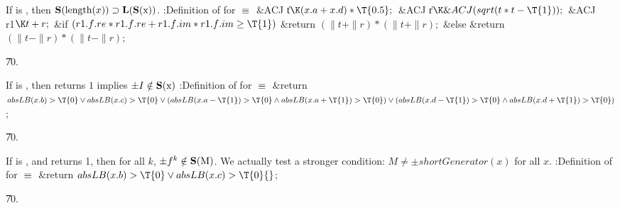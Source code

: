 If  is , then
$\reps{\PB{\\{length}(\|x)}} \supset \tlength{\reps{x}}$.
\endproposition
\Y\B\4:Definition of  for \X${}\equiv{}$%
\6
\&{ACJ} \|t${}\K(\|x.\|a+\|x.\|d)*\T{0.5};{}$\6
\&{ACJ} \|r${}\K\&{ACJ}(\\{sqrt}(\|t*\|t-\T{1}));{}$\6
\&{ACJ} \\{r1}${}\K\|t+\|r;{}$\7
\&{if} ${}(\\{r1}.\|f.\\{re}*\\{r1}.\|f.\\{re}+\\{r1}.\|f.\\{im}*\\{r1}.\|f.%
\\{im}\G\T{1}){}$\1\5
\&{return} ${}(\|t+\|r)*(\|t+\|r);{}$\2\6
\&{else}\1\5
\&{return} ${}(\|t-\|r)*(\|t-\|r){}$;\2\par
\U70.\fi

If  is , then
 returns $1$ implies $\pm I \notin \bf S(\hbox{x})$
\endproposition
\Y\B\4:Definition of  for \X${}%
\E{}$\6
\&{return} ${}\\{absLB}(\|x.\|b)>\T{0}\V\\{absLB}(\|x.\|c)>\T{0}\V(\\{absLB}(%
\|x.\|a-\T{1})>\T{0}\W\\{absLB}(\|x.\|a+\T{1})>\T{0})\V(\\{absLB}(\|x.\|d-%
\T{1})>\T{0}\W\\{absLB}(\|x.\|d+\T{1})>\T{0}){}$;\par
\U70.\fi

If  is , and  returns 1,
then for all $k$, $\pm f^k \notin \bf S(\hbox{M})$.
\endproposition
We actually test a stronger condition:
$M \neq \pm shortGenerator(x)$ for all $x$.
\Y\B\4:Definition of  for \X${}%
\E{}$\6
\&{return} ${}\\{absLB}(\|x.\|b)>\T{0}\V\\{absLB}(\|x.\|c)>\T{0}{}$;\par
\U70.\fi

